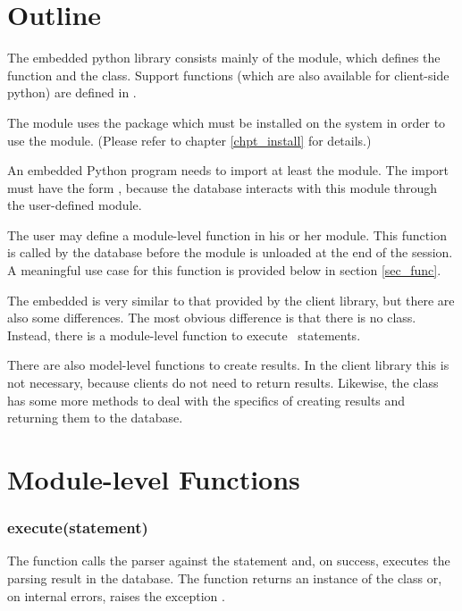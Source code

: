 \section{Outline}
The embedded python library consists mainly
of the  module, which defines
the  function and the  class.
Support functions (which are also available
for client-side python) are defined in
.

The module uses the package 
which must be installed on the system in order
to use the  module.
(Please refer to chapter
\ref{chpt_install} for details.)

An embedded Python program needs to import at least
the  module. The import must have
the form , because the database
interacts with this module through the user-defined
module.

The user may define a module-level function
 in his or her module.
This function is called by the database
before the module is unloaded at the end of
the session. A meaningful use case for this
function is provided below in section \ref{sec_func}.

The embedded  is very similar
to that provided by the client library,
but there are also some differences.
The most obvious difference is that
there is no  class.
Instead, there is a module-level function
to execute \sql\ statements.

There are also model-level functions
to create results. In the client library
this is not necessary, because clients
do not need to return results.
Likewise, the  class
has some more methods to deal with
the specifics of creating results
and returning them to the database.


\section{Module-level Functions}

\subsubsection{execute(statement)}
The function calls the parser against the statement and, on success,
executes the parsing result in the database.
The function returns an instance of the  class
or, on internal errors, raises the exception .

